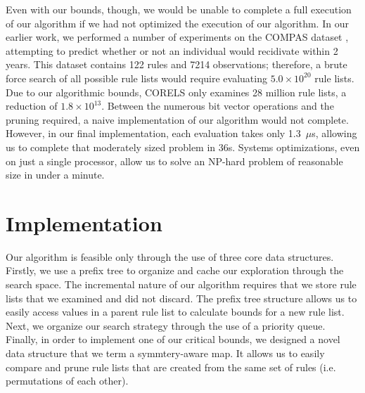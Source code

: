 \documentclass[format=sigconf]{acmart}
\begin{document}
Even with our bounds, though, we would be unable to complete a full execution of our algorithm if we had not optimized the execution of our algorithm.
In our earlier work, we performed a number of experiments on the COMPAS dataset \cite{LarsonMaKiAn16}, attempting to predict whether or not an individual would recidivate within 2 years.
This dataset contains 122 rules and 7214 observations; therefore, a brute force search of all possible rule lists would require evaluating ${5.0 \times 10^{20}}$ rule lists.
Due to our algorithmic bounds, CORELS only examines 28 million rule lists, a reduction of ${1.8 \times 10^{13}}$.
Between the numerous bit vector operations and the pruning required, a naive implementation of our algorithm would not complete.
However, in our final implementation, each evaluation takes only 1.3~$\mu$s, allowing us to complete that moderately sized problem in 36s.
Systems optimizations, even on just a single processor, allow us to solve an NP-hard problem of reasonable size in under a minute.

\section{Implementation}
Our algorithm is feasible only through the use of three core data structures.
Firstly, we use a prefix tree to organize and cache our exploration through the search space.
The incremental nature of our algorithm requires that we store rule lists that we examined and did not discard.
The prefix tree structure allows us to easily access values in a parent rule list to calculate bounds for a new rule list.
Next, we organize our search strategy through the use of a priority queue.
Finally, in order to implement one of our critical bounds, we designed a novel data structure that we term a symmtery-aware map.
It allows us to easily compare and prune rule lists that are created from the same set of rules (i.e. permutations of each other).
\end{document}
